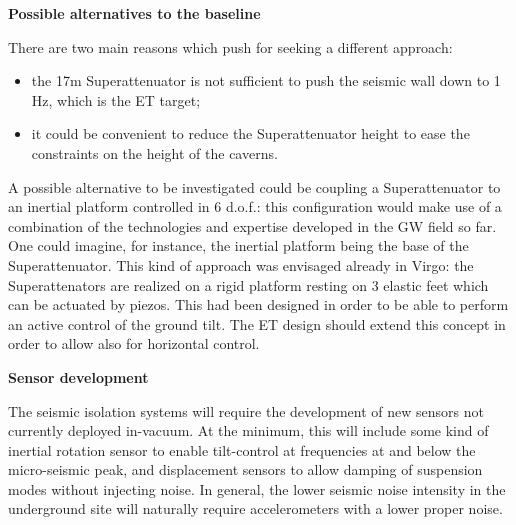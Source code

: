 {\bf Possible alternatives to the baseline}

There are two main reasons which push for seeking a different approach:
\begin{itemize}
    \item the 17m Superattenuator is not sufficient to push the seismic wall down to 1 Hz, which is the ET target;
    \item it could be convenient to reduce the Superattenuator height to ease the constraints on the height of the caverns.
\end{itemize}


A possible alternative to be investigated could be coupling a Superattenuator to an inertial platform controlled in 6 d.o.f.: this configuration would make use of a combination of the technologies and expertise developed in the GW field so far. One could imagine, for instance, the inertial platform being the base of the Superattenuator. This kind of approach was envisaged already in Virgo: the Superattenators are realized on a rigid platform resting on 3 elastic feet which can be actuated by piezos. This had been designed in order to be able to perform an active control of the ground tilt. The ET design should extend this concept in order to allow also for horizontal control.









{\bf Sensor development}

The seismic isolation systems will require the development of new sensors not currently deployed in-vacuum. At the minimum, this will include some kind of inertial rotation sensor to enable tilt-control at frequencies at and below the micro-seismic peak, and displacement sensors to allow damping of suspension modes without injecting noise.
In general, the lower seismic noise intensity in the underground site will naturally require accelerometers with a lower proper noise. 

